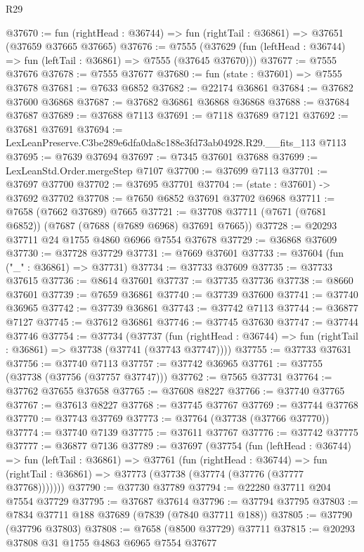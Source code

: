 \begin{lexlean}{R29}
\begin{coremodule}
@37670 := fun (rightHead : @36744) => fun (rightTail : @36861) => @37651 (@37659 @37665 @37665)
@37676 := @7555
    (@37629 (fun (leftHead : @36744) => fun (leftTail : @36861) => @7555 (@37645 @37670)))
@37677 := @7555 @37676
@37678 := @7555 @37677
@37680 := fun (state : @37601) => @7555 @37678
@37681 := @7633 @6852
@37682 := @22174 @36861
@37684 := @37682 @37600 @36868
@37687 := @37682 @36861 @36868 @36868
@37688 := @37684 @37687
@37689 := @37688 @7113
@37691 := @7118 @37689 @7121
@37692 := @37681 @37691
@37694 := LexLeanPreserve.C3be289e6dfa0da8c188e3fd73ab04928.R29.__fits_113 @7113
@37695 := @7639 @37694
@37697 := @7345 @37601 @37688
@37699 := LexLeanStd.Order.mergeStep @7107
@37700 := @37699 @7113
@37701 := @37697 @37700
@37702 := @37695 @37701
@37704 := (state : @37601) -> @37692 @37702
@37708 := @7650 @6852 @37691 @37702 @6968
@37711 := @7658 (@7662 @37689) @7665
@37721 := @37708 @37711 (@7671 (@7681 @6852)) (@7687 (@7688 (@7689 @6968) @37691 @7665))
@37728 := @20293 @37711 @24 @1755 @4860 @6966 @7554 @37678
@37729 := @36868 @37609
@37730 := @37728 @37729
@37731 := @7669 @37601
@37733 := @37604 (fun ("_" : @36861) => @37731)
@37734 := @37733 @37609
@37735 := @37733 @37615
@37736 := @8614 @37601
@37737 := @37735 @37736
@37738 := @8660 @37601
@37739 := @7659 @36861
@37740 := @37739 @37600
@37741 := @37740 @36965
@37742 := @37739 @36861
@37743 := @37742 @7113
@37744 := @36877 @7127
@37745 := @37612 @36861
@37746 := @37745 @37630
@37747 := @37744 @37746
@37754 := @37734
    (@37737
      (fun (rightHead : @36744) => fun (rightTail : @36861) => @37738 (@37741 (@37743 @37747))))
@37755 := @37733 @37631
@37756 := @37740 @7113
@37757 := @37742 @36965
@37761 := @37755 (@37738 (@37756 (@37757 @37747)))
@37762 := @7565 @37731
@37764 := @37762 @37655 @37658
@37765 := @37608 @8227
@37766 := @37740 @37765
@37767 := @37613 @8227
@37768 := @37745 @37767
@37769 := @37744 @37768
@37770 := @37743 @37769
@37773 := @37764 (@37738 (@37766 @37770))
@37774 := @37740 @7139
@37775 := @37611 @37767
@37776 := @37742 @37775
@37777 := @36877 @7136
@37789 := @37697
    (@37754
      (fun (leftHead : @36744) =>
      fun (leftTail : @36861) =>
      @37761
        (fun (rightHead : @36744) =>
        fun (rightTail : @36861) => @37773 (@37738 (@37774 (@37776 (@37777 @37768)))))))
@37790 := @37730 @37789
@37794 := @22280 @37711 @204 @7554 @37729
@37795 := @37687 @37614
@37796 := @37794 @37795
@37803 := @7834 @37711 @188 @37689 (@7839 (@7840 @37711 @188))
@37805 := @37790 (@37796 @37803)
@37808 := @7658 (@8500 @37729) @37711
@37815 := @20293 @37808 @31 @1755 @4863 @6965 @7554 @37677

\end{coremodule}
\end{lexlean}
